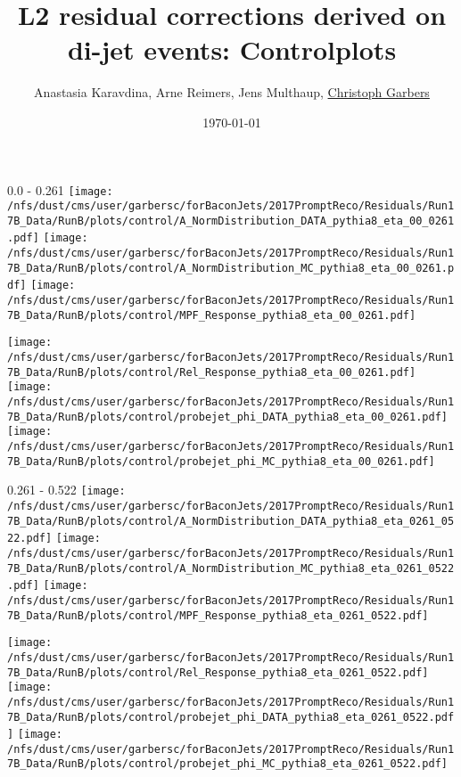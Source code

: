 \documentclass[t,compress]{beamer}
\title[L2 residual corrections]{L2 residual corrections derived on di-jet events: Controlplots}
\author[Christoph Garbers]{Anastasia Karavdina, Arne Reimers, Jens Multhaup, \underline{Christoph Garbers}}
\institute[UHH]{University of Hamburg}
\date{\today}
\begin{document}
\begin{frame}
 \titlepage
\end{frame}

\begin{frame}{0.0 - 0.261}
	\texttt{[image: /nfs/dust/cms/user/garbersc/forBaconJets/2017PromptReco/Residuals/Run17B\_Data/RunB/plots/control/A\_NormDistribution\_DATA\_pythia8\_eta\_00\_0261.pdf]}
	\texttt{[image: /nfs/dust/cms/user/garbersc/forBaconJets/2017PromptReco/Residuals/Run17B\_Data/RunB/plots/control/A\_NormDistribution\_MC\_pythia8\_eta\_00\_0261.pdf]}
	\texttt{[image: /nfs/dust/cms/user/garbersc/forBaconJets/2017PromptReco/Residuals/Run17B\_Data/RunB/plots/control/MPF\_Response\_pythia8\_eta\_00\_0261.pdf]}
\newline

	\texttt{[image: /nfs/dust/cms/user/garbersc/forBaconJets/2017PromptReco/Residuals/Run17B\_Data/RunB/plots/control/Rel\_Response\_pythia8\_eta\_00\_0261.pdf]}
	\texttt{[image: /nfs/dust/cms/user/garbersc/forBaconJets/2017PromptReco/Residuals/Run17B\_Data/RunB/plots/control/probejet\_phi\_DATA\_pythia8\_eta\_00\_0261.pdf]}
	\texttt{[image: /nfs/dust/cms/user/garbersc/forBaconJets/2017PromptReco/Residuals/Run17B\_Data/RunB/plots/control/probejet\_phi\_MC\_pythia8\_eta\_00\_0261.pdf]}
\end{frame}

\begin{frame}{0.261 - 0.522}
	\texttt{[image: /nfs/dust/cms/user/garbersc/forBaconJets/2017PromptReco/Residuals/Run17B\_Data/RunB/plots/control/A\_NormDistribution\_DATA\_pythia8\_eta\_0261\_0522.pdf]}
	\texttt{[image: /nfs/dust/cms/user/garbersc/forBaconJets/2017PromptReco/Residuals/Run17B\_Data/RunB/plots/control/A\_NormDistribution\_MC\_pythia8\_eta\_0261\_0522.pdf]}
	\texttt{[image: /nfs/dust/cms/user/garbersc/forBaconJets/2017PromptReco/Residuals/Run17B\_Data/RunB/plots/control/MPF\_Response\_pythia8\_eta\_0261\_0522.pdf]}
\newline

	\texttt{[image: /nfs/dust/cms/user/garbersc/forBaconJets/2017PromptReco/Residuals/Run17B\_Data/RunB/plots/control/Rel\_Response\_pythia8\_eta\_0261\_0522.pdf]}
	\texttt{[image: /nfs/dust/cms/user/garbersc/forBaconJets/2017PromptReco/Residuals/Run17B\_Data/RunB/plots/control/probejet\_phi\_DATA\_pythia8\_eta\_0261\_0522.pdf]}
	\texttt{[image: /nfs/dust/cms/user/garbersc/forBaconJets/2017PromptReco/Residuals/Run17B\_Data/RunB/plots/control/probejet\_phi\_MC\_pythia8\_eta\_0261\_0522.pdf]}
\end{frame}
\end{document}
